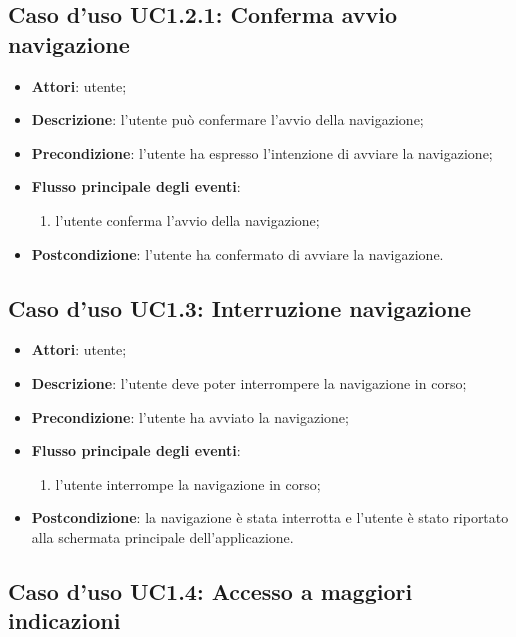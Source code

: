 \documentclass[../AnalisiDeiRequisiti.tex]{subfiles}
\begin{document}
\subsection{Caso d'uso UC1.2.1: Conferma avvio navigazione}
\begin{itemize}
	\item \textbf{Attori}: utente;
	\item \textbf{Descrizione}: l'utente può confermare l'avvio della navigazione; 
	\item \textbf{Precondizione}: l'utente ha espresso l'intenzione di avviare la navigazione;
	
	\item \textbf{Flusso principale degli eventi}:
	\begin{enumerate}
		\item l'utente conferma l'avvio della navigazione;
		
	\end{enumerate}
	\item \textbf{Postcondizione}: l'utente ha confermato di avviare la navigazione.
\end{itemize}
\hypertarget{UC1.3}{}
\subsection{Caso d'uso UC1.3: Interruzione navigazione}
\begin{itemize}
	\item \textbf{Attori}: utente;
	\item \textbf{Descrizione}: l'utente deve poter interrompere la navigazione in corso; 
	\item \textbf{Precondizione}: l'utente ha avviato la navigazione;
	
	\item \textbf{Flusso principale degli eventi}:
	\begin{enumerate}
		\item l'utente interrompe la navigazione in corso;
		
	\end{enumerate}
	\item \textbf{Postcondizione}: la navigazione è stata interrotta e l'utente è stato riportato alla schermata principale dell'applicazione.
\end{itemize}
\hypertarget{UC1.4}{}
\subsection{Caso d'uso UC1.4: Accesso a maggiori indicazioni}
\end{document}
